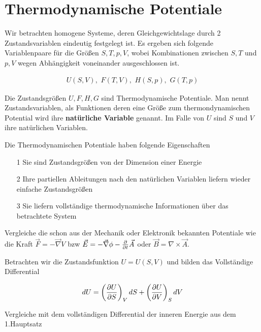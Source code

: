 
\usepackage{amsmath} 





\section*{Thermodynamische Potentiale}

Wir betrachten homogene Systeme, deren Gleichgewichtslage durch 2 Zustandsvariablen eindeutig festgelegt ist. Es ergeben sich folgende Variablenpaare für die Größen \(S,T,p,V\), wobei Kombinationen zwischen \(S,T\) und \(p,V\) wegen Abhängigkeit voneinander ausgeschlossen ist.

\begin{align}
  \label{eq:1}
  U(S,V),\,\, F(T,V),\,\, H(S,p),\,\, G(T,p)
\end{align}

Die Zustandsgrößen \(U,F,H,G\) sind Thermodynamische Potentiale. Man nennt Zustandsvariablen, als Funktionen deren eine Größe zum thermondynamischen Potential wird ihre \textbf{natürliche Variable} genannt. Im Falle von \(U\) sind \(S\) und \(V\) ihre natürlichen Variablen.

Die Thermodynamischen Potentiale haben folgende Eigenschaften

\begin{itemize}
\item[1] Sie sind Zustandsgrößen von der Dimension einer Energie
\item[2] Ihre partiellen Ableitungen nach den natürlichen Variablen liefern wieder einfache Zustandsgrößen
\item[3] Sie liefern vollständige thermodynamische Informationen über das betrachtete System
\end{itemize}

Vergleiche die schon aus der Mechanik oder Elektronik bekannten Potentiale wie die Kraft \(\vec F=-\vec \nabla V\) bzw \(\vec E = -\vec \nabla\phi - \pdiff_t \vec A\) oder \(\vec B = \nabla\times \vec A\).

Betrachten wir die Zustandsfunktion \(U = U(S,V)\) und bilden das Vollständige Differential

\begin{align}
  \label{eq:2}
  dU = \left(\pdiff U_S \right)_V dS +  \left(\pdiff U_V \right)_S dV
\end{align}

Vergleiche mit dem vollständigen Differential der inneren Energie aus dem 1.Hauptsatz

